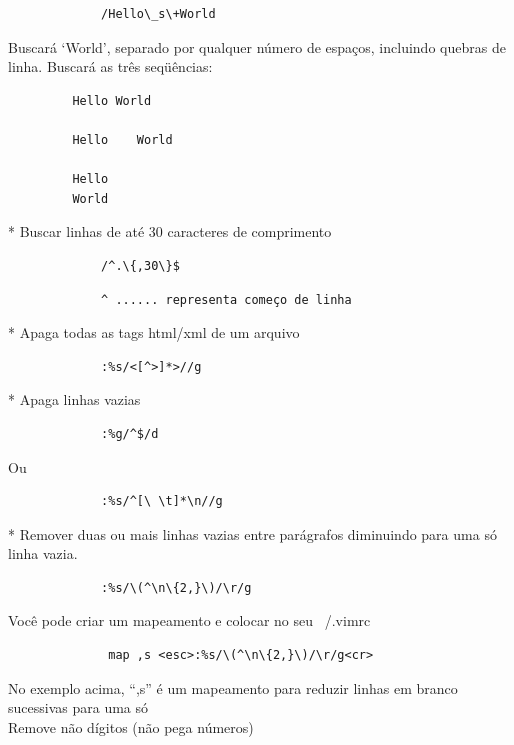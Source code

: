 \documentclass[10pt,a4paper,openany]{book}
\begin{document}
\begin{verbatim}
			 /Hello\_s\+World
\end{verbatim}

Buscará `World', separado por qualquer número de espaços,
incluindo quebras de linha. Buscará as três seqüências:

\begin{verbatim}
		 Hello World

		 Hello    World

		 Hello
		 World
\end{verbatim}

* Buscar linhas de até 30 caracteres de comprimento

\begin{verbatim}
			 /^.\{,30\}$
\end{verbatim}

\begin{verbatim}
			 ^ ...... representa começo de linha
\end{verbatim}

* Apaga todas as tags html/xml de um arquivo

\begin{verbatim}
			 :%s/<[^>]*>//g
\end{verbatim}

* Apaga linhas vazias

\begin{verbatim}
			 :%g/^$/d
\end{verbatim}

Ou

\begin{verbatim}
			 :%s/^[\ \t]*\n//g
\end{verbatim}

* Remover duas ou mais linhas vazias entre parágrafos diminuindo para
uma só linha vazia.

\begin{verbatim}
			 :%s/\(^\n\{2,}\)/\r/g
\end{verbatim}

Você pode criar um mapeamento e colocar no seu ~/.vimrc

\begin{verbatim}
			  map ,s <esc>:%s/\(^\n\{2,}\)/\r/g<cr>
\end{verbatim}

No exemplo acima, ``,s'' é um mapeamento para reduzir linhas em branco
sucessivas para uma só  \\


Remove não dígitos (não pega números)
\end{document}
